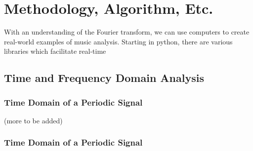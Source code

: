 \documentclass[10pt]{article}
\begin{document}
%
%
%
%
%



\section{Methodology, Algorithm, Etc.}

\hspace{\parindent} With an understanding of the Fourier transform, we can use computers to create real-world examples of music analysis. Starting in python, there are various libraries which facilitate real-time 

\subsection{Time and Frequency Domain Analysis}

\subsubsection{Time Domain of a Periodic Signal}

\noindent(more to be added)

\subsubsection{Time Domain of a Periodic Signal}
\end{document}
